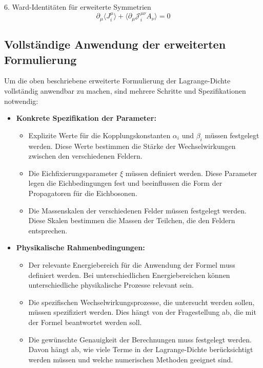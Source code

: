 \documentclass{article}
\begin{document}
 6. Ward-Identitäten für erweiterte Symmetrien
\begin{equation}
	\partial_\mu \langle J_i^{\mu} \rangle + \langle \partial_\mu \mathcal{J}_i^{\mu\nu} A_\nu \rangle = 0
\end{equation}

\subsection{Vollständige Anwendung der erweiterten Formulierung}

Um die oben beschriebene erweiterte Formulierung der Lagrange-Dichte vollständig anwendbar zu machen, sind mehrere Schritte und Spezifikationen notwendig:

\begin{itemize}
	\item \textbf{Konkrete Spezifikation der Parameter:}
	\begin{itemize}
		\item Explizite Werte für die Kopplungskonstanten $\alpha_i$ und $\beta_i$ müssen festgelegt werden. Diese Werte bestimmen die Stärke der Wechselwirkungen zwischen den verschiedenen Feldern.
		\item Die Eichfixierungsparameter $\xi$ müssen definiert werden. Diese Parameter legen die Eichbedingungen fest und beeinflussen die Form der Propagatoren für die Eichbosonen.
		\item Die Massenskalen der verschiedenen Felder müssen festgelegt werden. Diese Skalen bestimmen die Massen der Teilchen, die den Feldern entsprechen.
	\end{itemize}
	
	\item \textbf{Physikalische Rahmenbedingungen:}
	\begin{itemize}
		\item Der relevante Energiebereich für die Anwendung der Formel muss definiert werden. Bei unterschiedlichen Energiebereichen können unterschiedliche physikalische Prozesse relevant sein.
		\item Die spezifischen Wechselwirkungsprozesse, die untersucht werden sollen, müssen spezifiziert werden. Dies hängt von der Fragestellung ab, die mit der Formel beantwortet werden soll.
		\item Die gewünschte Genauigkeit der Berechnungen muss festgelegt werden. Davon hängt ab, wie viele Terme in der Lagrange-Dichte berücksichtigt werden müssen und welche numerischen Methoden geeignet sind.
	\end{itemize}
	

\end{itemize}
\end{document}

